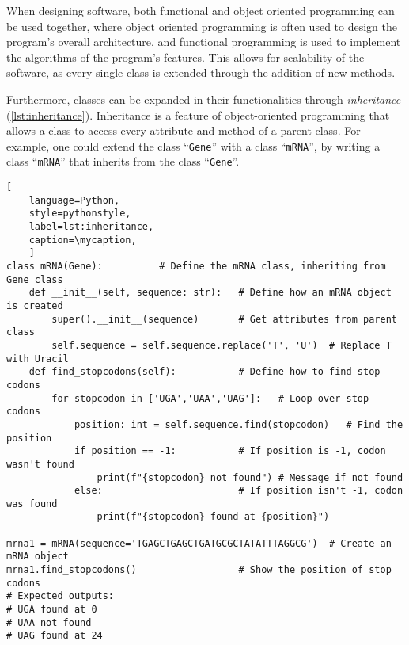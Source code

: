 When designing software, both functional and object oriented programming can be
used together, where object oriented programming is often used to design the
program's overall architecture, and functional programming is used to implement
the algorithms of the program's features. This allows for scalability of the
software, as every single class is extended through the addition of new methods.


Furthermore, classes can be expanded in their functionalities through
\emph{inheritance} (\autoref{lst:inheritance}). Inheritance is a feature of
object-oriented programming that allows a class to access every attribute and
method of a parent class. For example, one could extend the class
``\texttt{Gene}'' with a class ``\texttt{mRNA}'', by writing a class
``\texttt{mRNA}'' that inherits from the class ``\texttt{Gene}''.

\vspace{\vhalf}

\def\mycaption{ Example of inheritance in Python. The class ``\texttt{mRNA}''
    inherits from the class ``\texttt{Gene}'', and has
    two methods, ``\texttt{\_\_init\_\_}'' and ``\texttt{find\_stopcodon}''. ``\texttt{find\_stopcodon}'' loops through a list of stop codons (\texttt{for x in list}):
    For each stop codon, the position is found. If a codon
    wasn't found, the \texttt{.find()} method returns -1, which leads to a
    different print message. Note that \texttt{f""} formats strings
    to include variables.}
\begin{lstlisting}[
    language=Python,
    style=pythonstyle,
    label=lst:inheritance,
    caption=\mycaption,
    ]
class mRNA(Gene):          # Define the mRNA class, inheriting from Gene class
    def __init__(self, sequence: str):   # Define how an mRNA object is created
        super().__init__(sequence)       # Get attributes from parent class
        self.sequence = self.sequence.replace('T', 'U')  # Replace T with Uracil
    def find_stopcodons(self):           # Define how to find stop codons
        for stopcodon in ['UGA','UAA','UAG']:   # Loop over stop codons
            position: int = self.sequence.find(stopcodon)   # Find the position
            if position == -1:           # If position is -1, codon wasn't found
                print(f"{stopcodon} not found") # Message if not found
            else:                        # If position isn't -1, codon was found
                print(f"{stopcodon} found at {position}")         
            
mrna1 = mRNA(sequence='TGAGCTGAGCTGATGCGCTATATTTAGGCG')  # Create an mRNA object
mrna1.find_stopcodons()                  # Show the position of stop codons
# Expected outputs: 
# UGA found at 0
# UAA not found
# UAG found at 24
\end{lstlisting}


